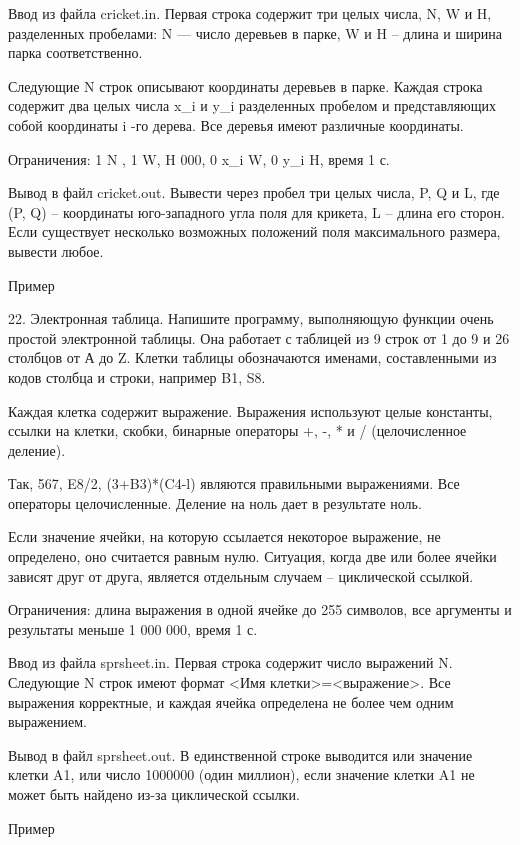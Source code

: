 \documentclass[]{article}
\begin{document}
Ввод из файла cricket.in. Первая строка содержит три целых числа, N, W и H, разделенных пробелами: N — число деревьев в парке, W и H – длина и ширина парка соответственно.

Следующие N строк описывают координаты деревьев в парке. Каждая строка содержит два целых числа x_i и y_i разделенных пробелом и представляющих собой координаты i -го дерева. Все деревья имеют различные координаты.

Ограничения: 1 \leq N , 1 \leq W, H  000, 0 \leq x_i \leq W, 0 \leq y_i \leq H, время 1 с.

Вывод в файл cricket.out. Вывести через пробел три целых числа, P, Q и L, где (P, Q) – координаты юго-западного угла поля для крикета, L – длина его сторон. Если существует несколько возможных положений поля максимального размера, вывести любое.

Пример



22. Электронная таблица. Напишите программу, выполняющую функции очень простой электронной таблицы. Она работает с таблицей из 9 строк от 1 до 9 и 26 столбцов от А до Z. Клетки таблицы обозначаются именами, составленными из кодов столбца и строки, например B1, S8.

Каждая клетка содержит выражение. Выражения используют целые константы, ссылки на клетки, скобки, бинарные операторы +, -, * и / (целочисленное деление).

Так, 567, E8/2, (3+B3)*(C4-l) являются правильными выражениями. Все операторы целочисленные. Деление на ноль дает в результате ноль.

Если значение ячейки, на которую ссылается некоторое выражение, не определено, оно считается равным нулю. Ситуация, когда две или более ячейки зависят друг от друга, является отдельным случаем – циклической ссылкой.

Ограничения: длина выражения в одной ячейке до 255 символов, все аргументы и результаты меньше 1 000 000, время 1 с.

Ввод из файла sprsheet.in. Первая строка содержит число выражений N. Следующие N строк имеют формат <Имя клетки>=<выражение>. Все выражения корректные, и каждая ячейка определена не более чем одним выражением.

Вывод в файл sprsheet.out. В единственной строке выводится или значение клетки A1, или число 1000000 (один миллион), если значение клетки A1 не может быть найдено из-за циклической ссылки.

Пример
\end{document}

